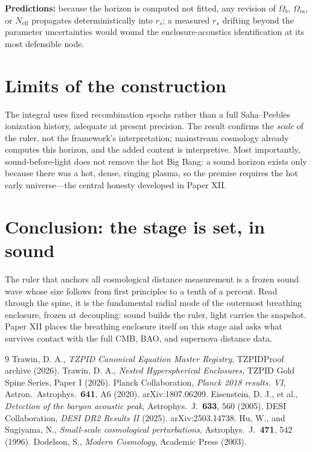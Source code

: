 \documentclass[11pt]{article}
\theoremstyle{remark}
\begin{document}
\textbf{Predictions:} because the horizon is computed not fitted, any revision of $\Omega_b$, $\Omega_m$, or $N_{\mathrm{eff}}$ propagates deterministically into $r_s$; a measured $r_s$ drifting beyond the parameter uncertainties would wound the enclosure-acoustics identification at its most defensible node.
\section{Limits of the construction}
The integral uses fixed recombination epochs rather than a full Saha--Peebles ionization history, adequate at present precision. The result confirms the \emph{scale} of the ruler, not the framework's interpretation; mainstream cosmology already computes this horizon, and the added content is interpretive. Most importantly, sound-before-light does not remove the hot Big Bang: a sound horizon exists only because there was a hot, dense, ringing plasma, so the premise requires the hot early universe---the central honesty developed in Paper XII.
\section{Conclusion: the stage is set, in sound}
The ruler that anchors all cosmological distance measurement is a frozen sound wave whose size follows from first principles to a tenth of a percent. Read through the spine, it is the fundamental radial mode of the outermost breathing enclosure, frozen at decoupling: sound builds the ruler, light carries the snapshot. Paper XII places the breathing enclosure itself on this stage and asks what survives contact with the full CMB, BAO, and supernova distance data.
\begin{thebibliography}{9}
 Trawin, D. A., \emph{TZPID Canonical Equation Master Registry}, TZPIDProof archive (2026).
 Trawin, D. A., \emph{Nested Hyperspherical Enclosures}, TZPID Gold Spine Series, Paper I (2026).
 Planck Collaboration, \emph{Planck 2018 results. VI}, Astron.\ Astrophys.\ \textbf{641}, A6 (2020). arXiv:1807.06209.
 Eisenstein, D. J., et al., \emph{Detection of the baryon acoustic peak}, Astrophys.\ J.\ \textbf{633}, 560 (2005).
 DESI Collaboration, \emph{DESI DR2 Results II} (2025). arXiv:2503.14738.
 Hu, W., and Sugiyama, N., \emph{Small-scale cosmological perturbations}, Astrophys.\ J.\ \textbf{471}, 542 (1996).
 Dodelson, S., \emph{Modern Cosmology}, Academic Press (2003).
\end{thebibliography}
\end{document}
